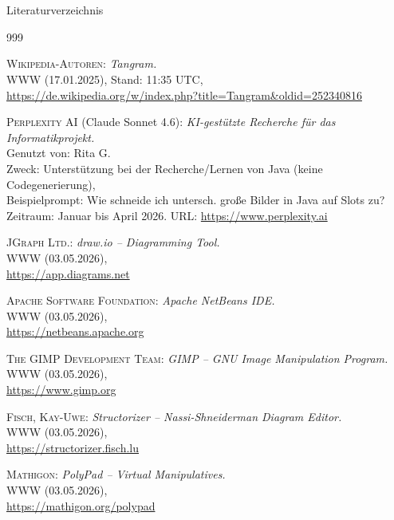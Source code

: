 \documentclass{beamer}
\begin{document}
	\section*{}
	\begin{frame}[allowframebreaks]{Literaturverzeichnis}
		
		\begin{thebibliography}{999}
			
			 \textsc{Wikipedia-Autoren}: \textit{Tangram.}\\
			{\small WWW (17.01.2025), Stand: 11:35 UTC,}\\
			\url{https://de.wikipedia.org/w/index.php?title=Tangram&oldid=252340816}
			
			 \textsc{Perplexity AI} (Claude Sonnet 4.6):
			\textit{KI-gestützte Recherche für das Informatikprojekt.}\\
			{\small Genutzt von: Rita G.}\\
			{\small Zweck: Unterstützung bei der Recherche/Lernen von Java (keine Codegenerierung),}\\
			{\small Beispielprompt: Wie schneide ich untersch. große Bilder in Java auf Slots zu?}\\
			{\small Zeitraum: Januar bis April 2026. URL: \url{https://www.perplexity.ai}}
			
			 \textsc{JGraph Ltd.}: \textit{draw.io – Diagramming Tool.}\\
			{\small WWW (03.05.2026),}\\
			\url{https://app.diagrams.net}
			
			 \textsc{Apache Software Foundation}: \textit{Apache NetBeans IDE.}\\
			{\small WWW (03.05.2026),}\\
			\url{https://netbeans.apache.org}
			
			 \textsc{The GIMP Development Team}: \textit{GIMP – GNU Image Manipulation Program.}\\
			{\small WWW (03.05.2026),}\\
			\url{https://www.gimp.org}
			
			 \textsc{Fisch, Kay-Uwe}: \textit{Structorizer – Nassi-Shneiderman Diagram Editor.}\\
			{\small WWW (03.05.2026),}\\
			\url{https://structorizer.fisch.lu}
			
			 \textsc{Mathigon}: \textit{PolyPad – Virtual Manipulatives.}\\
			{\small WWW (03.05.2026),}\\
			\url{https://mathigon.org/polypad}
			
		\end{thebibliography}
	\end{frame}
	
\end{document}
